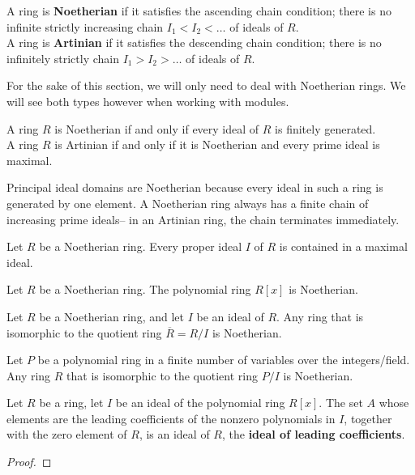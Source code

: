 \documentclass{memoir}
\begin{document}


\begin{defn}
	A ring is \textbf{Noetherian} if it satisfies the ascending chain condition; there is no infinite strictly increasing chain \(I_1<I_2<\ldots\) of ideals of \(R\).\\

	A ring is \textbf{Artinian} if it satisfies the descending chain condition; there is no infinitely strictly chain \(I_1 > I_2 > \ldots\) of ideals of \(R\).
\end{defn}
For the sake of this section, we will only need to deal with Noetherian rings. We will see both types however when working with modules.
\begin{prop}
	A ring \(R\) is Noetherian if and only if every ideal of \(R\) is finitely generated.\\

	A ring \(R\) is Artinian if and only if it is Noetherian and every prime ideal is maximal.
\end{prop}
Principal ideal domains are Noetherian because every ideal in such a ring is generated by one element. A Noetherian ring always has a finite chain of increasing prime ideals-- in an Artinian ring, the chain terminates immediately.

\begin{cor}
	Let \(R\) be a Noetherian ring. Every proper ideal \(I\) of \(R\) is contained in a maximal ideal.
\end{cor}

\begin{thm}
	Let \(R\) be a Noetherian ring. The polynomial ring \(R[x]\) is Noetherian.
\end{thm}

\begin{prop}
	Let \(R\) be a Noetherian ring, and let \(I\) be an ideal of \(R\). Any ring that is isomorphic to the quotient ring \(\overline{R} = R / I\) is Noetherian.
\end{prop}
\begin{cor}
	Let \(P\) be a polynomial ring in a finite number of variables over the integers/field. Any ring \(R\) that is isomorphic to the quotient ring \(P / I\) is Noetherian.
\end{cor}
\begin{lemma}
	Let \(R\) be a ring, let \(I\) be an ideal of the polynomial ring \(R[x]\). The set \(A\) whose elements are the leading coefficients of the nonzero polynomials in \(I\), together with the zero element of \(R\), is an ideal of \(R\), the \textbf{ideal of leading coefficients}.
\end{lemma}
\begin{proof}
	
\end{proof}


\end{document}
